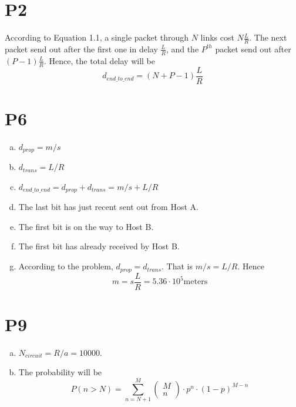 \documentclass[a4paper, 11pt]{article}
\begin{document}
\section*{P2}
\hspace{14pt} According to Equation 1.1, a single packet through $N$ links cost $N \frac{L}{R}$. The next packet send out after the first one in delay $\frac{L}{R}$, and the $P^{th}$ packet send out after $(P - 1)\frac{L}{R}$. Hence, the total delay will be $$d_{end\_to\_end} = (N + P - 1)\frac{L}{R}$$
	
\section*{P6}
	\begin{enumerate}[a.]
		\item $d_{prop} = m / s$
		\item $d_{trans} = L / R$
		\item $d_{end\_to\_end} = d_{prop} + d_{trans} = m / s + L / R$
		\item The last bit has just recent sent out from Host A.
		\item The first bit is on the way to Host B.
		\item The first bit has already received by Host B.
		\item According to the problem, $d_{prop} = d_{trans}$. That is $m / s = L / R $. Hence $$ m = s \frac{L}{R} = 5.36 \cdot 10^5 \text{meters}$$
	\end{enumerate}
	
\section*{P9}
	\begin{enumerate}[a.]
		\item $N_{circuit} = R / a = 10000$.
		\item The probability will be $$P(n > N) = \sum_{n=N+1}^M \begin{pmatrix} M \\ n\end{pmatrix} \cdot p^n \cdot (1-p)^{M-n}$$
	\end{enumerate}
	
\end{document}
